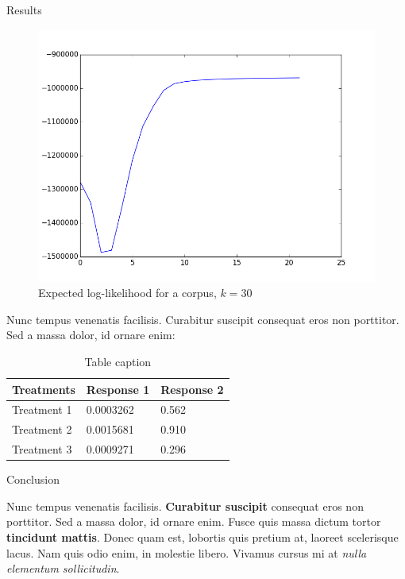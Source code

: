 \documentclass[final]{beamer}
\newlength{\onecolwid}
\begin{document}
\begin{frame}[t]
\begin{columns}[t]
\begin{column}{\onecolwid}
\begin{block}{Results}

\begin{figure}[ht!]
\includegraphics[width=0.8\linewidth]{../img/figure_1.png}
\caption{Expected log-likelihood for a corpus, $k=30$}
\end{figure}

Nunc tempus venenatis facilisis. Curabitur suscipit consequat eros non porttitor. Sed a massa dolor, id ornare enim:

\begin{table}
\vspace{2ex}
\begin{tabular}{l l l}
\toprule
\textbf{Treatments} & \textbf{Response 1} & \textbf{Response 2}\\
\midrule
Treatment 1 & 0.0003262 & 0.562 \\
Treatment 2 & 0.0015681 & 0.910 \\
Treatment 3 & 0.0009271 & 0.296 \\
\bottomrule
\end{tabular}
\caption{Table caption}
\end{table}
\end{block}


\begin{block}{Conclusion}

Nunc tempus venenatis facilisis. \textbf{Curabitur suscipit} consequat eros non porttitor. Sed a massa dolor, id ornare enim. Fusce quis massa dictum tortor \textbf{tincidunt mattis}. Donec quam est, lobortis quis pretium at, laoreet scelerisque lacus. Nam quis odio enim, in molestie libero. Vivamus cursus mi at \textit{nulla elementum sollicitudin}.


\end{block}
\end{column}
\end{columns}
\end{frame}
\end{document}
